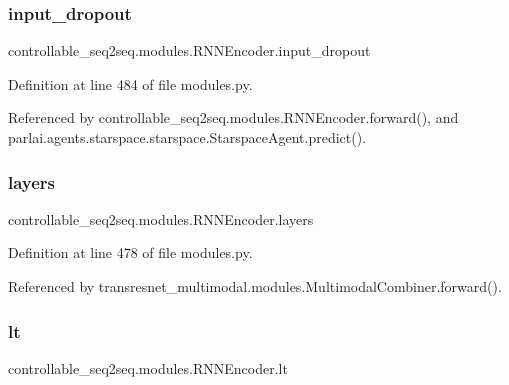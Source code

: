\subsubsection{\texorpdfstring{input\+\_\+dropout}{input\_dropout}}
{\footnotesize\ttfamily controllable\+\_\+seq2seq.\+modules.\+R\+N\+N\+Encoder.\+input\+\_\+dropout}



Definition at line 484 of file modules.\+py.



Referenced by controllable\+\_\+seq2seq.\+modules.\+R\+N\+N\+Encoder.\+forward(), and parlai.\+agents.\+starspace.\+starspace.\+Starspace\+Agent.\+predict().

\mbox{\label{classcontrollable__seq2seq_1_1modules_1_1RNNEncoder_a2ed52c9c67b263d1ea0bedb6446e2e0b}} 
\subsubsection{\texorpdfstring{layers}{layers}}
{\footnotesize\ttfamily controllable\+\_\+seq2seq.\+modules.\+R\+N\+N\+Encoder.\+layers}



Definition at line 478 of file modules.\+py.



Referenced by transresnet\+\_\+multimodal.\+modules.\+Multimodal\+Combiner.\+forward().

\mbox{\label{classcontrollable__seq2seq_1_1modules_1_1RNNEncoder_a7c083c7ef40078795a99ae87f429e1e4}} 
\subsubsection{\texorpdfstring{lt}{lt}}
{\footnotesize\ttfamily controllable\+\_\+seq2seq.\+modules.\+R\+N\+N\+Encoder.\+lt}



